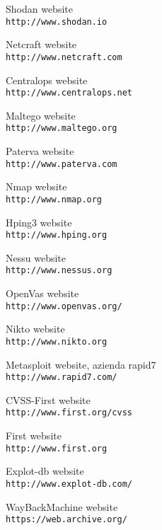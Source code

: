 \documentclass[a4paper,12pt]{article}
\begin{document}
\begin{thebibliography}{20}
Shodan website
\\\texttt{http://www.shodan.io}

Netcraft website
\\\texttt{http://www.netcraft.com}

Centralops website
\\\texttt{http://www.centralops.net}

Maltego website
\\\texttt{http://www.maltego.org}

Paterva website
\\\texttt{http://www.paterva.com}

Nmap website
\\\texttt{http://www.nmap.org}

Hping3 website
\\\texttt{http://www.hping.org}

Nessu website
\\\texttt{http://www.nessus.org}

OpenVas website
\\\texttt{http://www.openvas.org/}

Nikto website
\\\texttt{http://www.nikto.org}

Metasploit website, azienda rapid7
\\\texttt{http://www.rapid7.com/}

CVSS-First website 
\\\texttt{http://www.first.org/cvss}

First website
\\\texttt{http://www.first.org}

Explot-db website
\\\texttt{http://www.explot-db.com/}

WayBackMachine website
\\\texttt{https://web.archive.org/}

\end{thebibliography}
\end{document}
